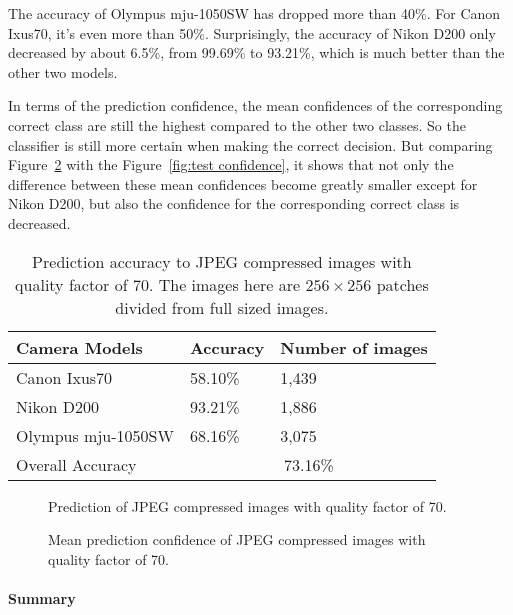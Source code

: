 \documentclass[a4paper, 9pt, twocolumn]{extarticle}
\begin{document}
The accuracy of Olympus mju-1050SW has dropped more than 40\%. For Canon Ixus70, it's even more than 50\%. Surprisingly, the accuracy of Nikon D200 only decreased by about 6.5\%, from 99.69\% to 93.21\%, which is much better than the other two models.

In terms of the prediction confidence, the mean confidences of the corresponding correct class are still the highest compared to the other two classes. So the classifier is still more certain when making the correct decision. But comparing Figure~\ref{fig:jpeg confidence} with the Figure~\ref{fig:test confidence}, it shows that not only the difference between these mean confidences become greatly smaller except for Nikon D200, but also the confidence for the corresponding correct class is decreased.

\begin{table}
	\center
	\begin{tabular}{ |p{3.2cm}|p{1.4cm}|p{2.6cm}| }
		\hline
		Camera Models & Accuracy & Number of images\\
		\hline
		Canon Ixus70 & 58.10\% & 1,439 \\
		Nikon D200 & 93.21\% & 1,886 \\
		Olympus mju-1050SW & 68.16\% & 3,075 \\
		\hline
		Overall Accuracy & \multicolumn{2}{c|}{73.16\%} \\
		\hline
	\end{tabular}
	\caption{\label{tab:jpeg} Prediction accuracy to JPEG compressed images with quality factor of 70. The images here are $ 256 \times 256 $ patches divided from full sized images.}
\end{table}

\begin{figure}
	\centering
	\resizebox{!}{!}{
		{}
	}
	\caption{Prediction of JPEG compressed images with quality factor of 70.}
	\label{fig:jpeg result}
\end{figure}

\begin{figure}
	\centering
	\resizebox{!}{!}{
		{}
	}
	\caption{Mean prediction confidence of JPEG compressed images with quality factor of 70.}
	\label{fig:jpeg confidence}
\end{figure}

\paragraph{Summary}
\label{section:jpeg summary}
\end{document}
